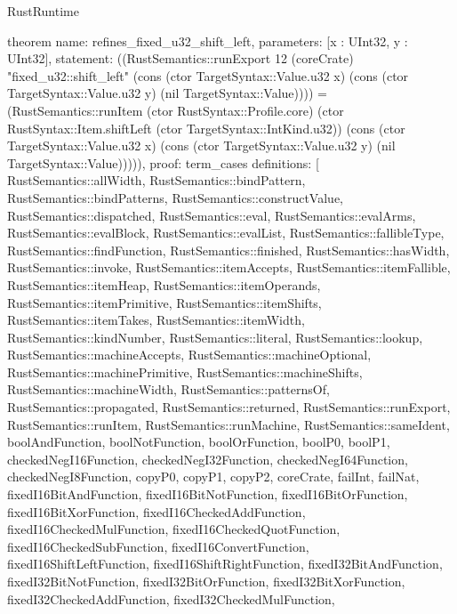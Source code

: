 \begin{lexlean}{RustRuntime}
\begin{semanticmodule}
theorem{
  name: refines_fixed_u32_shift_left,
  parameters: [x : UInt32, y : UInt32],
  statement: ((RustSemantics::runExport 12 (coreCrate) "fixed_u32::shift_left" (cons (ctor TargetSyntax::Value.u32 x) (cons (ctor TargetSyntax::Value.u32 y) (nil TargetSyntax::Value)))) = (RustSemantics::runItem (ctor RustSyntax::Profile.core) (ctor RustSyntax::Item.shiftLeft (ctor TargetSyntax::IntKind.u32)) (cons (ctor TargetSyntax::Value.u32 x) (cons (ctor TargetSyntax::Value.u32 y) (nil TargetSyntax::Value))))),
  proof: term_cases{
    definitions: [
      RustSemantics::allWidth,
      RustSemantics::bindPattern,
      RustSemantics::bindPatterns,
      RustSemantics::constructValue,
      RustSemantics::dispatched,
      RustSemantics::eval,
      RustSemantics::evalArms,
      RustSemantics::evalBlock,
      RustSemantics::evalList,
      RustSemantics::fallibleType,
      RustSemantics::findFunction,
      RustSemantics::finished,
      RustSemantics::hasWidth,
      RustSemantics::invoke,
      RustSemantics::itemAccepts,
      RustSemantics::itemFallible,
      RustSemantics::itemHeap,
      RustSemantics::itemOperands,
      RustSemantics::itemPrimitive,
      RustSemantics::itemShifts,
      RustSemantics::itemTakes,
      RustSemantics::itemWidth,
      RustSemantics::kindNumber,
      RustSemantics::literal,
      RustSemantics::lookup,
      RustSemantics::machineAccepts,
      RustSemantics::machineOptional,
      RustSemantics::machinePrimitive,
      RustSemantics::machineShifts,
      RustSemantics::machineWidth,
      RustSemantics::patternsOf,
      RustSemantics::propagated,
      RustSemantics::returned,
      RustSemantics::runExport,
      RustSemantics::runItem,
      RustSemantics::runMachine,
      RustSemantics::sameIdent,
      boolAndFunction,
      boolNotFunction,
      boolOrFunction,
      boolP0,
      boolP1,
      checkedNegI16Function,
      checkedNegI32Function,
      checkedNegI64Function,
      checkedNegI8Function,
      copyP0,
      copyP1,
      copyP2,
      coreCrate,
      failInt,
      failNat,
      fixedI16BitAndFunction,
      fixedI16BitNotFunction,
      fixedI16BitOrFunction,
      fixedI16BitXorFunction,
      fixedI16CheckedAddFunction,
      fixedI16CheckedMulFunction,
      fixedI16CheckedQuotFunction,
      fixedI16CheckedSubFunction,
      fixedI16ConvertFunction,
      fixedI16ShiftLeftFunction,
      fixedI16ShiftRightFunction,
      fixedI32BitAndFunction,
      fixedI32BitNotFunction,
      fixedI32BitOrFunction,
      fixedI32BitXorFunction,
      fixedI32CheckedAddFunction,
      fixedI32CheckedMulFunction,
}}
\end{semanticmodule}
\end{lexlean}
